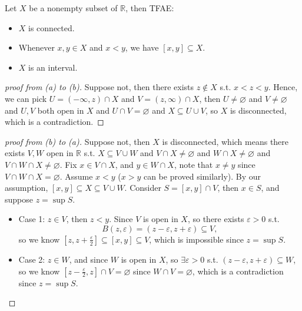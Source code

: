 \begin{theorem}
    Let \(X\) be a nonempty subset of \(\mathbb{R} \), then TFAE: 
    \begin{itemize}
        \item [(a)] \(X\) is connected.  
        \item [(b)] Whenever \(x, y \in X\) and \(x < y\), we have \([x, y] \subseteq X\).    
        \item [(c)] \(X\) is an interval. 
    \end{itemize}  
\end{theorem}
\begin{proof}[proof from (a) to (b)]   
    Suppose not, then there exists \(z \notin X\) s.t. \(x < z < y\). Hence, we can pick \(U = (-\infty , z) \cap X\) and \(V = (z, \infty ) \cap X\), then \(U \neq \varnothing \) and \(V \neq \varnothing \) and \(U, V\) both open in \(X\) and \(U \cap V = \varnothing \) and \(X \subseteq U \cup V\), so \(X\) is disconnected, which is a contradiction.           
\end{proof} 
\begin{proof}[proof from (b) to (a)]
    Suppose not, then \(X\) is disconnected, which means there exists \(V, W\) open in \(\mathbb{R} \) s.t. \(X \subseteq V \cup W\) and \(V \cap X \neq \varnothing \) and \(W \cap X \neq \varnothing \) and \(V \cap W \cap X \neq \varnothing \). Fix \(x \in V \cap X\), and \(y \in W \cap X\), note that \(x \neq y\) since \(V \cap W \cap X = \varnothing \). Assume \(x < y\) (\(x > y\) can be proved similarly). By our assumption, \([x, y] \subseteq X \subseteq V \cup W\). Consider \(S = [x, y] \cap V\), then \(x \in S\), and suppose \(z = \sup S\). 
    \begin{itemize}
        \item Case 1: \(z \in V\), then \(z < y\). Since \(V\) is open in \(X\), so there exists \(\varepsilon > 0\) s.t. 
        \[
            B(z, \varepsilon ) = (z - \varepsilon , z + \varepsilon ) \subseteq V, 
        \] so we know \(\left[ z, z + \frac{\varepsilon}{2} \right] \subseteq [x, y] \subseteq V \), which is impossible since \(z = \sup S\). 
        \item Case 2: \(z \in W\), and since \(W\) is open in \(X\), so \(\exists \varepsilon > 0\) s.t. \((z - \varepsilon , z + \varepsilon ) \subseteq W\), so we know \(\left[ z - \frac{\varepsilon}{2}, z \right] \cap V = \varnothing  \) since \(W \cap V = \varnothing \), which is a contradiction since \(z = \sup S\).          
    \end{itemize}
\end{proof}